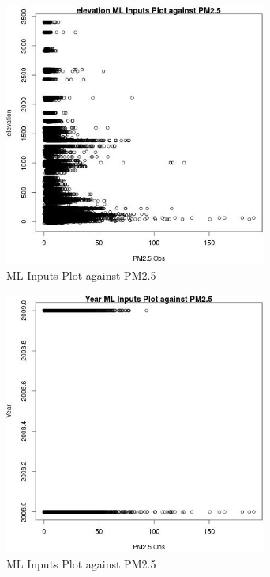 \begin{figure} 
\centering  
\includegraphics[width=0.77\textwidth]{Code_Outputs/Report_ML_input_PM25_Step4_part_e_de_duplicated_aves_elevationvPM25_Obs.jpg} 
\caption{\label{fig:Report_ML_input_PM25_Step4_part_e_de_duplicated_aveselevationvPM25_Obs}ML Inputs Plot against PM2.5} 
\end{figure} 
 

\begin{figure} 
\centering  
\includegraphics[width=0.77\textwidth]{Code_Outputs/Report_ML_input_PM25_Step4_part_e_de_duplicated_aves_YearvPM25_Obs.jpg} 
\caption{\label{fig:Report_ML_input_PM25_Step4_part_e_de_duplicated_avesYearvPM25_Obs}ML Inputs Plot against PM2.5} 
\end{figure} 
 

